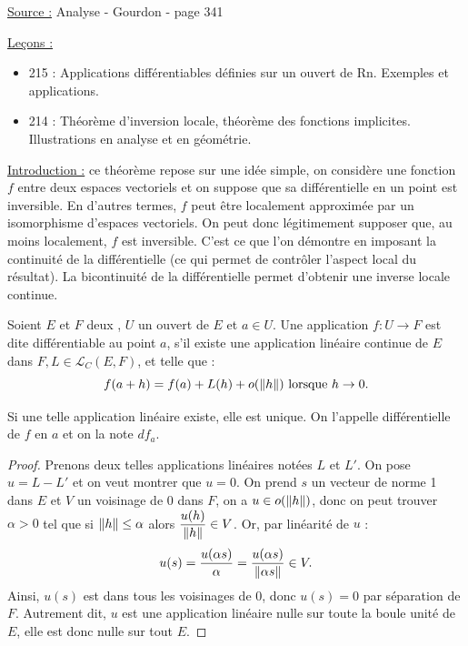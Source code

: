 
\renewcommand{\L}{\mathcal{L}}

\pagestyle{fancy}

\fancyhead[R]{}



\underline{Source :} Analyse - Gourdon - page 341 \newline

\underline{Leçons :}
\begin{itemize}
\item 215 : Applications différentiables définies sur un ouvert de Rn. Exemples et applications.
\item 214 : Théorème d’inversion locale, théorème des fonctions implicites. Illustrations en analyse et en géométrie.
\end{itemize}
\vspace{5pt}

\underline{Introduction :} ce théorème repose sur une idée simple, on considère une fonction $f$ entre deux espaces vectoriels et on
suppose que sa différentielle en un point est inversible. En d'autres termes, $f$ peut être localement approximée par un isomorphisme
d'espaces vectoriels. On peut donc légitimement supposer que, au moins localement, $f$ est inversible.
C'est ce que l'on démontre en imposant la continuité de la différentielle (ce qui permet de contrôler l'aspect local du résultat). 
La bicontinuité de la différentielle permet d'obtenir une inverse locale continue.

\begin{defn}
Soient $E$ et $F$ deux \Rev, $U$ un ouvert de $E$ et $a \in U$. Une application $f:U \to F$ est dite différentiable au point $a$, s'il existe
une application linéaire continue de $E$ dans $F, L \in \L_C(E,F)$, et telle que :
\[ f(a+h) = f(a) + L(h) + o(\lVert h\rVert) \text{ lorsque } h \to 0 . \]
\end{defn}

\begin{lem}
Si une telle application linéaire existe, elle est unique. On l'appelle différentielle de $f$ en $a$ et on la note $df_a$.
\end{lem}

\begin{proof}
Prenons deux telles applications linéaires notées $L$ et $L'$. On pose $u = L - L'$ et on veut montrer que $u=0$.
On prend $s$ un vecteur de norme 1 dans $E$ et $V$ un voisinage de 0 dans $F$, on a $u \in o(\lVert h\rVert)$, donc on peut trouver
$\alpha > 0$ tel que si $\lVert h\rVert \leq \alpha$ alors $\dfrac{u(h)}{\lVert h\rVert} \in V$. Or, par linéarité de $u$ :
\[ u(s) = \dfrac{u(\alpha s)}{\alpha} = \dfrac{u(\alpha s)}{\lVert\alpha s\rVert} \in V. \]
Ainsi, $u(s)$ est dans tous les voisinages de $0$, donc $u(s) = 0$ par séparation de $F$. Autrement dit, $u$ est une application linéaire nulle
sur toute la boule unité de $E$, elle est donc nulle sur tout $E$.
\end{proof}

